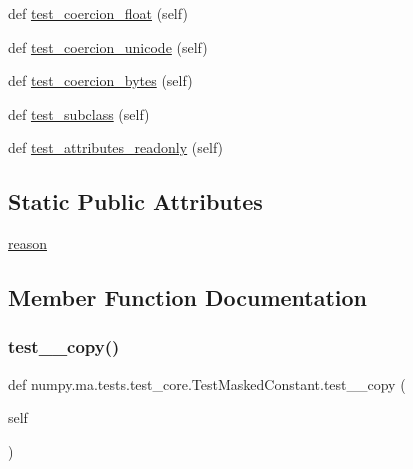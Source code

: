 \begin{DoxyCompactItemize}
\item 
def \hyperlink{classnumpy_1_1ma_1_1tests_1_1test__core_1_1TestMaskedConstant_abbe4fcfc204b9bf31ca4d3cb3445d545}{test\+\_\+coercion\+\_\+float} (self)
\item 
def \hyperlink{classnumpy_1_1ma_1_1tests_1_1test__core_1_1TestMaskedConstant_a53b758b5995a6bffb505a09fc002c40d}{test\+\_\+coercion\+\_\+unicode} (self)
\item 
def \hyperlink{classnumpy_1_1ma_1_1tests_1_1test__core_1_1TestMaskedConstant_a014bc68fb2beaa1fa76a3256112c0cdf}{test\+\_\+coercion\+\_\+bytes} (self)
\item 
def \hyperlink{classnumpy_1_1ma_1_1tests_1_1test__core_1_1TestMaskedConstant_ac670aef13cb4f2d4a1224176372f33b5}{test\+\_\+subclass} (self)
\item 
def \hyperlink{classnumpy_1_1ma_1_1tests_1_1test__core_1_1TestMaskedConstant_aabab1c1d4564ac4a128cbb8b8b84c9b2}{test\+\_\+attributes\+\_\+readonly} (self)
\end{DoxyCompactItemize}
\subsection*{Static Public Attributes}
\begin{DoxyCompactItemize}
\item 
\hyperlink{classnumpy_1_1ma_1_1tests_1_1test__core_1_1TestMaskedConstant_aa4e788f06cd9790bc616fe118fe70a40}{reason}
\end{DoxyCompactItemize}


\subsection{Member Function Documentation}
\mbox{\label{classnumpy_1_1ma_1_1tests_1_1test__core_1_1TestMaskedConstant_a76a882c334cfc1bdd463eb50c48c3cf7}} 
\subsubsection{\texorpdfstring{test\+\_\+\+\_\+copy()}{test\_\_copy()}}
{\footnotesize\ttfamily def numpy.\+ma.\+tests.\+test\+\_\+core.\+Test\+Masked\+Constant.\+test\+\_\+\+\_\+copy (\begin{DoxyParamCaption}\item[{}]{self }\end{DoxyParamCaption})}

